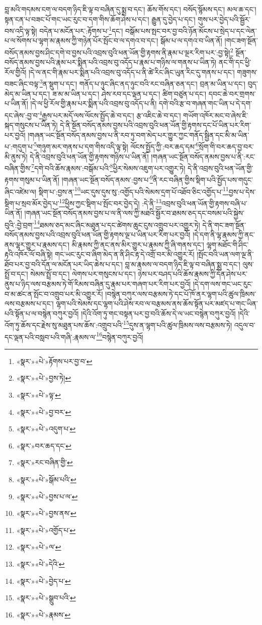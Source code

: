 བླ་མའི་གདམས་ངག་ལ་བདག་ཉིད་ཇི་ལྟ་བ་བཞིན་དུ་སྨྲ་བ་དང་། ཆོས་གོས་དང་། བསོད་སྙོམས་དང་། མལ་ཆ་དང་། སྟན་ངན་པ་བཟང་པོ་གང་ཡང་རུང་བ་དག་གིས་ཆོག་ཤེས་པ་དང་། རྒྱུན་དུ་བྱེད་པ་དང་། གུས་པར་བྱེད་པའི་སྦྱོར་བས་འདི་ལྟ་སྟེ། བདེན་པ་མངོན་པར་:རྟོགས་པ་\footnote{«སྣར་»«པེ་»རྟོགས་པར་བྱ་བ་}དང་། བསྒོམ་པས་སྤང་བར་བྱ་བའི་ཉོན་མོངས་པ་སྲེད་པ་དང་ལེན་པ་ལ་སོགས་པ་ལྷག་མ་རྣམས་ཀྱི་གཉེན་པོར་སྤོང་བ་ལ་དགའ་བ་དང་། སྒོམ་པ་ལ་དགའ་བ་ཡིན་ནོ། །གང་ཟག་སྔོན་བསོད་ནམས་བྱས་ཤིང་དགེ་བ་བྱས་པའི་འབྲས་བུའི་ཕན་ཡོན་གྱི་རྟགས་ནི་རྣམ་པ་ལྔར་རིག་པར་:བྱ་སྟེ།\footnote{«སྣར་»«པེ་»བྱས་ཏེ།} སྔོན་བསོད་ནམས་བྱས་པའི་རྣམ་པར་སྨིན་པའི་འབྲས་བུ་འདོད་པ་རྣམ་པ་གཉིས་ལ་གནས་པ་ཡིན་ཏེ། ནང་གི་དང་ཕྱི་རོལ་གྱིའོ། །དེ་ལ་ནང་གི་རྣམ་པར་སྨིན་པའི་འབྲས་བུ་འདོད་པ་ནི་ཚེ་རིང་ཞིང་ཡུན་རིང་དུ་གནས་པ་དང་། གཟུགས་བཟང་ཞིང་བལྟ་\footnote{«སྣར་»«པེ་»ལྟ་}ན་སྡུག་པ་དང་། གནོད་པ་ཉུང་ཞིང་ནད་ཉུང་བའི་རང་བཞིན་ཅན་དང་། བྲན་མ་ཡིན་པ་དང་། བུད་མེད་མ་ཡིན་པ་དང་། ཟ་མ་མ་ཡིན་པ་དང་། ཤེས་རབ་དང་ལྡན་པ་དང་། ཚིག་བཙུན་པ་དང་། དབང་ཆེ་བར་གྲགས་པ་ཡིན་ནོ། །དེ་ལ་ཕྱི་རོལ་གྱི་རྣམ་པར་སྨིན་པའི་འབྲས་བུ་འདོད་པ་ནི། དགེ་བའི་རྩ་བ་གཞན་གང་ཡིན་པ་དེ་དག་དང་ཞེས་:བྱ་བ་\footnote{«སྣར་»«པེ་»བྱ་བར་}རྒྱས་པར་མདོ་ལས་ལོངས་སྤྱོད་ཆེ་བ་དང་། རྩ་འཇིང་ཆེ་བ་དང་། གཡོག་འཁོར་མང་བ་ཞེས་ཇི་སྐད་གསུངས་པ་ཡིན་ཏེ། དེ་ནི་སྔོན་བསོད་ནམས་བྱས་པའི་འབྲས་བུའི་ཕན་ཡོན་གྱི་རྟགས་དང་པོ་ཡིན་པར་རིག་པར་བྱའོ། །གཞན་ཡང་སྔོན་བསོད་ནམས་བྱས་པ་ནི་རབ་ཏུ་བག་མེད་པར་གྱུར་ཀྱང་གནོད་སྦྱིན་དང་མི་མ་ཡིན་པ་:གདུག་པ་\footnote{«སྣར་»«པེ་»འདུག་པ་}གཉུག་མར་གནས་པ་དག་གིས་འདི་ལྟ་སྟེ། ལོངས་སྤྱོད་ཀྱི་:བར་ཆད་དམ་\footnote{«སྣར་»བར་ཆད་དང་}སྲོག་གི་བར་ཆད་བྱ་བར་མི་ནུས་ཏེ། དེ་ནི་འབྲས་བུའི་ཕན་ཡོན་གྱི་རྟགས་གཉིས་པ་ཡིན་ནོ། །གཞན་ཡང་སྔོན་བསོད་ནམས་བྱས་པ་ནི་:རང་བཞིན་གྱིས་\footnote{«སྣར་»རང་བཞིན་གྱི་}དགེ་བའི་ཆོས་རྣམས་:བསྒོམ་པའི་\footnote{«སྣར་»«པེ་»སྒོམ་པའི་}ཕྱིར་སེམས་འཇུག་པར་འགྱུར་ཏེ། དེ་ནི་འབྲས་བུའི་ཕན་ཡོན་གྱི་རྟགས་གསུམ་པ་ཡིན་ནོ། །གཞན་ཡང་སྔོན་བསོད་ནམས་:བྱས་པ་\footnote{«སྣར་»«པེ་»བྱས་པ་ལ་}ནི་རང་བཞིན་གྱིས་སྡིག་པའི་སྤྱོད་པས་གདུང་ཞིང་འཛེམ་ལ། སྡིག་པ་:བྱས་ན་\footnote{«སྣར་»«པེ་»བྱས་ནས་}ཡང་དུས་དུས་སུ་:འགྱོད་པའི་སེམས་དྲག་པོ་འཐོབ་ཅིང་འགྱོད་པ་\footnote{«སྣར་»«པེ་»འགྱོད་པ་}བྱས་པ་དེས་སྡིག་པ་སྲབ་མོར་བྱེད་པ་\footnote{«སྣར་»«པེ་»ལ་}ཕྱིས་ཀྱང་སྡིག་པ་སྤོང་བར་བྱེད་དེ། :དེ་ནི་\footnote{«སྣར་»«པེ་»དེའི་}འབྲས་བུའི་ཕན་ཡོན་གྱི་རྟགས་བཞི་པ་ཡིན་ནོ། །གཞན་ཡང་སྔོན་བསོད་ནམས་བྱས་པ་ལ་ནི་ལས་ཀྱི་མཐའི་སྦྱོར་བ་ཐམས་ཅད་དང་བསམ་པའི་སྐྱེས་བུའི་:བྱེ་བྲག་\footnote{«སྣར་»«པེ་»བྱེད་པ་}ཐམས་ཅད་མང་ཞིང་མཐུན་པ་དང་ཚེགས་ཆུང་ངུས་འགྲུབ་པར་འགྱུར་ཏེ། དེ་ནི་གང་ཟག་སྔོན་བསོད་ནམས་བྱས་པའི་འབྲས་བུའི་ཕན་ཡོན་གྱི་རྟགས་ལྔ་པ་ཡིན་པར་རིག་པར་བྱའོ། །དེ་དག་ནི་ལྷ་རྣམས་ཀྱི་ནང་ནས་ལྷར་གྱུར་པ་རྣམས་དང་། མི་རྣམས་ཀྱི་ནང་ནས་མིར་གྱུར་པ་རྣམས་ཀྱི་ཞི་གནས་དང་། ལྷག་མཐོང་གི་ཤིང་རྟའི་འཁོར་ལོ་བཞི་སྟེ། གང་ཡང་རུང་བ་ཞིག་མེད་ན་ནི་ཤིང་རྟ་དེ་འགྲོ་བར་མི་འགྱུར་རོ། །སྤོང་བའི་ཡན་ལག་ལྔ་ནི་ཐོབ་པར་བྱ་བའི་དོན་ལ་མངོན་པར་ཡིད་ཆེས་པ་དང་། བླ་མ་རྣམས་ལ་བདག་ཉིད་ཇི་ལྟ་བ་བཞིན་སྨྲ་བ་དང་། ལུས་སྤྲོ་བ་དང་། སེམས་སྤྲོ་བ་དང་། ལེགས་པར་གསུངས་པ་དང་། ཉེས་པར་བཤད་པའི་ཆོས་རྣམས་ཀྱི་དོན་ཤེས་པར་ནུས་པ་ཉིད་ལས་བརྩམས་ཏེ་གོ་རིམས་བཞིན་དུ་རྣམ་པར་གཞག་པར་རིག་པར་བྱའོ། །དེ་དག་ལས་གང་ཡང་རུང་བ་མ་ཚང་ན་སྤོང་བ་འགྲུབ་པར་མི་འགྱུར་རོ། །བསྙེན་བཀུར་ལས་བརྩམས་ཏེ་དང་པོ་ཁོ་ནར་ལྷག་པའི་ཚུལ་ཁྲིམས་ལས་བརྩམས་པ་དང་། ལྷག་པའི་སེམས་དང་ལྷག་པའི་ཤེས་རབ་ལ་བརྩམས་ནས་ཆོས་སྟོན་པར་མཛད་པ་གང་ཡིན་པའི་སྟོན་པ་ལ་བསྙེན་བཀུར་བྱའོ། །དེའི་འོག་ཏུ་གང་བསྟན་པར་བྱ་བའི་ཆོས་དེ་ལ་ཡང་བསྙེན་བཀུར་བྱའོ། །དེའི་འོག་ཏུ་ཆོས་དང་རྗེས་སུ་མཐུན་པས་ཆོས་:འགྲུབ་པའི་\footnote{«སྣར་»«པེ་»སྒྲུབ་པའི་}དུས་ན་ལྷག་པའི་ཚུལ་ཁྲིམས་ལས་བརྩམས་ཏེ། འདུལ་བ་དང་ལྡན་པའི་བསླབ་པའི་གཞི་:རྣམས་ལ་\footnote{«སྣར་»«པེ་»རྣམས་}བསྙེན་བཀུར་བྱའོ། 